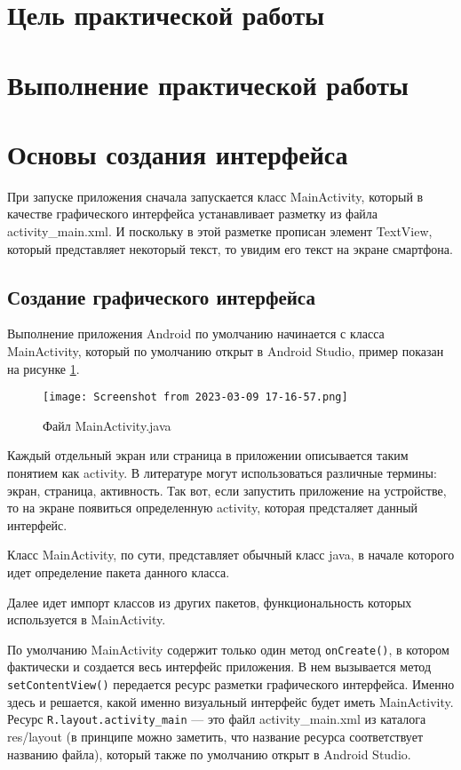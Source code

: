 \graphicspath{{~/Documents/MobAppDev/ThirdTask/img}}
\section*{\LARGE{Цель практической работы}}

\newpage

\section*{\LARGE{Выполнение практической работы}}

\section{Основы создания интерфейса}
При запуске приложения сначала запускается класс
MainActivity, который в качестве графического интерфейса устанавливает
разметку из файла activity\_main.xml. И поскольку в этой разметке прописан
элемент TextView, который представляет некоторый текст, то увидим
его текст на экране смартфона.

\subsection{Создание графического интерфейса}
Выполнение приложения Android по умолчанию начинается с класса
MainActivity, который по умолчанию открыт в Android Studio,
пример показан на рисунке \ref{fig:activity:start}.

\begin{figure}[h!tp]
	\centering
	\texttt{[image: Screenshot from 2023-03-09 17-16-57.png]}
	\caption{Файл MainActivity.java}
	\label{fig:activity:start}
\end{figure}

Каждый отдельный экран или страница в приложении описывается таким
понятием как activity. В литературе могут использоваться различные
термины: экран, страница, активность.
Так вот, если запустить приложение на устройстве, то на экране появиться
определенную activity, которая предсталяет данный интерфейс.\par
Класс MainActivity, по сути, представляет обычный класс java, в начале
которого идет определение пакета данного класса.\par
Далее идет импорт классов из других пакетов, функциональность которых
используется в MainActivity.\par
По умолчанию MainActivity содержит только один метод \texttt{onCreate()}, в
котором фактически и создается весь интерфейс приложения.
В нем вызывается метод \texttt{setContentView()} передается ресурс разметки
графического интерфейса.
Именно здесь и решается, какой именно визуальный интерфейс будет иметь
MainActivity. Ресурс \texttt{R.layout.activity\_main} --- это файл
activity\_main.xml из каталога res/layout (в
принципе можно заметить, что название ресурса соответствует названию
файла), который также по умолчанию открыт в Android Studio.

